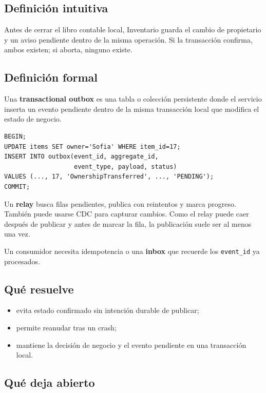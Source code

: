 \documentclass[variant=apuntes,cover=institutional,mode=screen]{ua-engineering-v6-article}
\begin{document}
\subsection{Definición intuitiva}

Antes de cerrar el libro contable local, Inventario guarda el cambio de propietario y un aviso pendiente dentro de la misma operación. Si la transacción confirma, ambos existen; si aborta, ninguno existe.

\subsection{Definición formal}

Una \textbf{transactional outbox} es una tabla o colección persistente donde el servicio inserta un evento pendiente dentro de la misma transacción local que modifica el estado de negocio.

\begin{verbatim}
BEGIN;
UPDATE items SET owner='Sofia' WHERE item_id=17;
INSERT INTO outbox(event_id, aggregate_id,
                   event_type, payload, status)
VALUES (..., 17, 'OwnershipTransferred', ..., 'PENDING');
COMMIT;
\end{verbatim}

Un \textbf{relay} busca filas pendientes, publica con reintentos y marca progreso. También puede usarse CDC para capturar cambios. Como el relay puede caer después de publicar y antes de marcar la fila, la publicación suele ser al menos una vez.

Un consumidor necesita idempotencia o una \textbf{inbox} que recuerde los \texttt{event\_id} ya procesados.

\subsection{Qué resuelve}

\begin{itemize}
\item evita estado confirmado sin intención durable de publicar;
\item permite reanudar tras un crash;
\item mantiene la decisión de negocio y el evento pendiente en una transacción local.
\end{itemize}

\subsection{Qué deja abierto}
\end{document}
